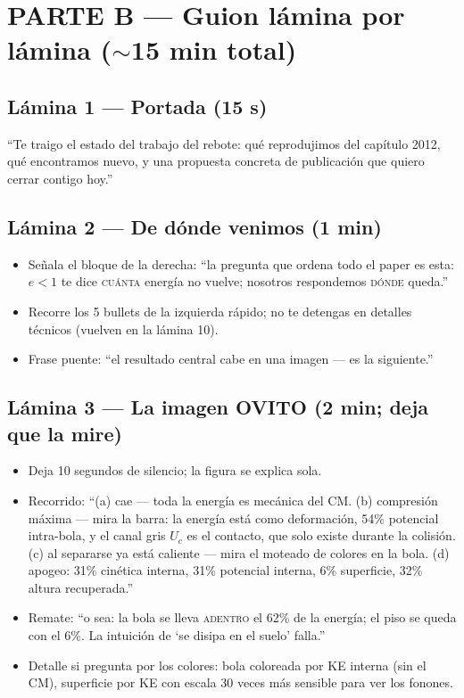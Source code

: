 \documentclass[11pt,a4paper]{article}
\begin{document}
\section{PARTE B --- Guion lámina por lámina ($\sim$15 min total)}

\subsection*{Lámina 1 --- Portada (15 s)}
``Te traigo el estado del trabajo del rebote: qué reprodujimos del
capítulo 2012, qué encontramos nuevo, y una propuesta concreta de
publicación que quiero cerrar contigo hoy.''

\subsection*{Lámina 2 --- De dónde venimos (1 min)}
\begin{itemize}[leftmargin=1.4em]
    \item Señala el bloque de la derecha: ``la pregunta que ordena todo
    el paper es esta: $e<1$ te dice \textsc{cuánta} energía no vuelve;
    nosotros respondemos \textsc{dónde} queda.''
    \item Recorre los 5 bullets de la izquierda rápido; no te detengas en
    detalles técnicos (vuelven en la lámina 10).
    \item Frase puente: ``el resultado central cabe en una imagen --- es
    la siguiente.''
\end{itemize}

\subsection*{Lámina 3 --- La imagen OVITO (2 min; deja que la mire)}
\begin{itemize}[leftmargin=1.4em]
    \item Deja 10 segundos de silencio; la figura se explica sola.
    \item Recorrido: ``(a) cae --- toda la energía es mecánica del CM.
    (b) compresión máxima --- mira la barra: la energía está como
    deformación, 54\% potencial intra-bola, y el canal gris $U_c$ es el
    contacto, que solo existe durante la colisión. (c) al separarse ya
    está caliente --- mira el moteado de colores en la bola. (d) apogeo:
    31\% cinética interna, 31\% potencial interna, 6\% superficie, 32\%
    altura recuperada.''
    \item Remate: ``o sea: la bola se lleva \textsc{adentro} el 62\% de
    la energía; el piso se queda con el 6\%. La intuición de `se disipa
    en el suelo' falla.''
    \item Detalle si pregunta por los colores: bola coloreada por KE
    interna (sin el CM), superficie por KE con escala 30 veces más
    sensible para ver los fonones.
\end{itemize}
\end{document}
